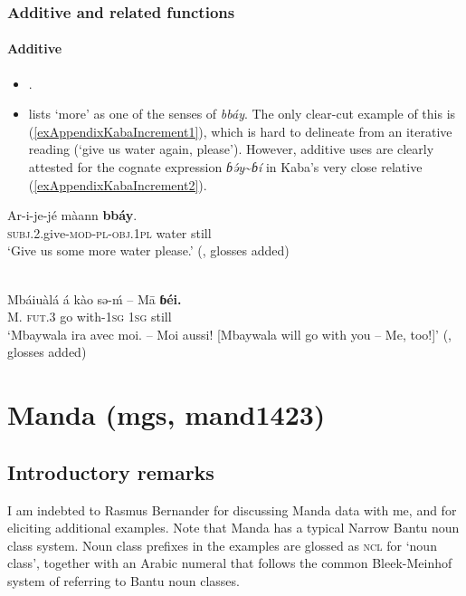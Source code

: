 \subsubsection{Additive and related functions}
\paragraph{Additive}\label{appendixKabaAdditive}
\begin{itemize}
	\item \textcite[425]{Moser2004}. 
	\item  \textcite[425]{Moser2004} lists \lq more' as one of the senses of \textit{bbáy}. The only clear-cut example of this is (\ref{exAppendixKabaIncrement1}), which is hard to delineate from an iterative reading (\lq give us water again, please'). However, additive uses are clearly attested for the cognate expression \textit{ɓə́y}\sim{}\textit{ɓí} in Kaba's very close relative  (\ref{exAppendixKabaIncrement2}).
\end{itemize}

\begin{exe}
	\ex\label{exAppendixKabaIncrement1}
	\gll Ar-i-je-jé màann \textbf{bbáy}.\\
	\textsc{subj}.2.give-\textsc{mod}-\textsc{pl}-\textsc{obj}.1\textsc{pl} water still\\
	\glt \lq Give us some more water please.\rq{ }(\cite[60]{MoserDingatoloum2007}, glosses added)
	
	\ex {} \label{exAppendixKabaIncrement2}\\
	\gll Mbáiuàlá á kào sə-ḿ – Mā \textbf{ɓéi.}\\
	M. \textsc{fut}.3 go with-1\textsc{sg} {} 1\textsc{sg} still\\
	\glt \lq Mbaywala ira avec moi. -- Moi aussi! [Mbaywala will go with you -- Me, too!]\rq{ }(\cite[119]{Vandame1963}, glosses added)
\end{exe}

\section{Manda (mgs, mand1423)}\label{appendixManda}
\subsection{Introductory remarks}
I am indebted to Rasmus Bernander for discussing Manda data with me, and for eliciting additional examples. Note that Manda has a typical Narrow Bantu noun class system. Noun class prefixes in the examples are glossed as \textsc{ncl} for \lq noun class', together with an Arabic numeral that follows the common Bleek-Meinhof system of referring to Bantu noun classes.

